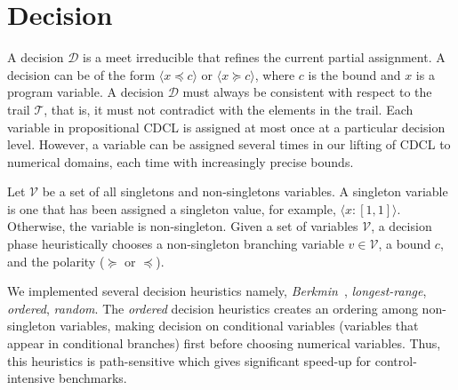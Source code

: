 \section{Decision}
A decision $\mathcal{D}$ is a meet irreducible that refines the 
current partial assignment.  A decision can be of the form 
$\langle x \preceq c \rangle$ or $\langle x \succeq c \rangle$, 
where $c$ is the bound and $x$ is a program variable.  A 
decision $\mathcal{D}$ must always be consistent with respect 
to the trail $\mathcal{T}$, that is, it must not contradict with 
the elements in the trail.  Each variable in propositional CDCL 
is assigned at most once at a particular decision level.  However, 
a variable can be assigned several times in our lifting of CDCL to 
numerical domains, each time with increasingly precise bounds.  

Let $\mathcal{V}$ be a set of all singletons and non-singletons 
variables.  A singleton variable is one that has been assigned a 
singleton value, for example, $\langle x:[1,1] \rangle$.  Otherwise, 
the variable is non-singleton.  Given a set of variables $\mathcal{V}$, 
a decision phase heuristically chooses a non-singleton branching 
variable $v \in \mathcal{V}$, a bound $c$, and the polarity ($\succeq$ or 
$\preceq$).  

We implemented several decision heuristics namely, {\em Berkmin}~\cite{}, 
{\em longest-range}, {\em ordered}, {\em random}.  The {\em ordered} 
decision heuristics creates an ordering among non-singleton variables, 
making decision on conditional variables (variables that appear in 
conditional branches) first before choosing numerical variables.  Thus, 
this heuristics is path-sensitive which gives significant speed-up for 
control-intensive benchmarks. 
     
